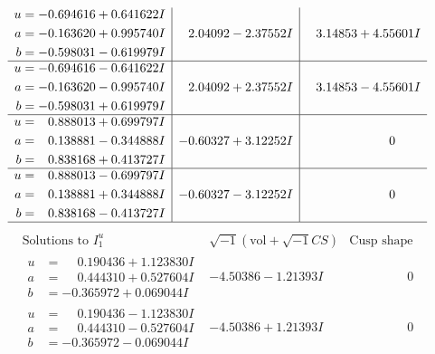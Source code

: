 \documentclass[1p]{elsarticle_modified}
\theoremstyle{definition}
\newcommand{\I}{\sqrt{-1}}
\begin{document}
$$\begin{array}{c|c|c}
\begin{aligned}
u &= -0.694616 + 0.641622 I \\
a &= -0.163620 + 0.995740 I \\
b &= -0.598031 - 0.619979 I\end{aligned}
 & \phantom{-}2.04092 - 2.37552 I & \phantom{-}3.14853 + 4.55601 I \\ \hline\begin{aligned}
u &= -0.694616 - 0.641622 I \\
a &= -0.163620 - 0.995740 I \\
b &= -0.598031 + 0.619979 I\end{aligned}
 & \phantom{-}2.04092 + 2.37552 I & \phantom{-}3.14853 - 4.55601 I \\ \hline\begin{aligned}
u &= \phantom{-}0.888013 + 0.699797 I \\
a &= \phantom{-}0.138881 - 0.344888 I \\
b &= \phantom{-}0.838168 + 0.413727 I\end{aligned}
 & -0.60327 + 3.12252 I & \phantom{-0.000000 } 0 \\ \hline\begin{aligned}
u &= \phantom{-}0.888013 - 0.699797 I \\
a &= \phantom{-}0.138881 + 0.344888 I \\
b &= \phantom{-}0.838168 - 0.413727 I\end{aligned}
 & -0.60327 - 3.12252 I & \phantom{-0.000000 } 0\\
 \hline 
 \end{array}$$\newpage$$\begin{array}{c|c|c}  
\text{Solutions to }I^u_{1}& \I (\text{vol} + \sqrt{-1}CS) & \text{Cusp shape}\\
 \hline 
\begin{aligned}
u &= \phantom{-}0.190436 + 1.123830 I \\
a &= \phantom{-}0.444310 + 0.527604 I \\
b &= -0.365972 + 0.069044 I\end{aligned}
 & -4.50386 - 1.21393 I & \phantom{-0.000000 } 0 \\ \hline\begin{aligned}
u &= \phantom{-}0.190436 - 1.123830 I \\
a &= \phantom{-}0.444310 - 0.527604 I \\
b &= -0.365972 - 0.069044 I\end{aligned}
 & -4.50386 + 1.21393 I & \phantom{-0.000000 } 0 \\ \hline\begin{aligned}

\end{aligned}
\end{array}$$
\end{document}
